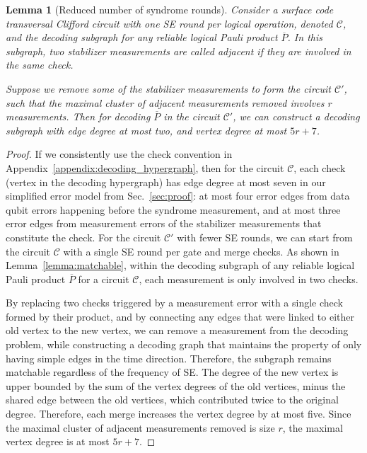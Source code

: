 \documentclass[prx,twocolumn,secnumarabic,balancelastpage,amsmath,amssymb,longbibliography]{revtex4-2}
\newtheorem{lemma}[thm]{Lemma}
\newcommand{\lop}[1]{\overline{#1}}
\begin{document}
\begin{lemma}[Reduced number of syndrome rounds]
%
Consider a surface code transversal Clifford circuit with one SE round per logical operation, denoted $\mathcal{C}$, and the decoding subgraph for any reliable logical Pauli product $\lop P$.
%
In this subgraph, two stabilizer measurements are called adjacent if they are involved in the same check.

Suppose we remove some of the stabilizer measurements to form the circuit $\mathcal{C}'$, such that the maximal cluster of adjacent measurements removed involves $r$ measurements.
%
Then for decoding $\lop P$ in the circuit $\mathcal{C}'$, we can construct a decoding subgraph with edge degree at most two, and vertex degree at most $5r+7$.
\label{lemma:fewer_se}
\end{lemma}

\begin{proof}
If we consistently use the check convention in Appendix~\ref{appendix:decoding_hypergraph}, then for the circuit $\mathcal{C}$, each check (vertex in the decoding hypergraph) has edge degree at most seven in our simplified error model from Sec.~\ref{sec:proof}: at most four error edges from data qubit errors happening before the syndrome measurement, and at most three error edges from measurement errors of the stabilizer measurements that constitute the check.
%
For the circuit $\mathcal{C}'$ with fewer SE rounds, we can start from the circuit $\mathcal{C}$ with a single SE round per gate and merge checks.
%
As shown in Lemma~\ref{lemma:matchable}, within the decoding subgraph of any reliable logical Pauli product $\lop P$ for a circuit $\mathcal{C}$, each measurement is only involved in two checks.

By replacing two checks triggered by a measurement error with a single check formed by their product, and by connecting any edges that were linked to either old vertex to the new vertex, we can remove a measurement from the decoding problem, while constructing a decoding graph that maintains the property of only having simple edges in the time direction.
%
Therefore, the subgraph remains matchable regardless of the frequency of SE.
%
The degree of the new vertex is upper bounded by the sum of the vertex degrees of the old vertices, minus the shared edge between the old vertices, which contributed twice to the original degree.
%
Therefore, each merge increases the vertex degree by at most five.
%
Since the maximal cluster of adjacent measurements removed is size $r$, the maximal vertex degree is at most $5r+7$.
\end{proof}
\end{document}
